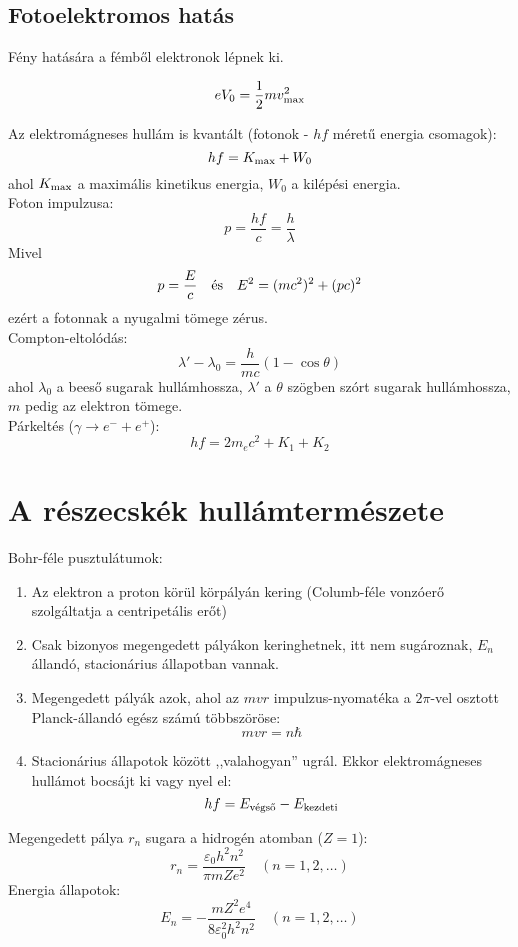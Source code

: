 \documentclass[12pt,a4paper,twocolumn]{article}
\begin{document}
  \subsection{Fotoelektromos hatás}

  Fény hatására a fémből elektronok lépnek ki.

  \[eV_0 = \frac{1}{2}mv_{\hbox{\scriptsize max}}^2\]
  
  Az elektromágneses hullám is kvantált (fotonok - $hf$ méretű energia csomagok):
  \[hf = K_{\hbox{\scriptsize max}} + W_0\]
  ahol $K_{\hbox{\scriptsize max}}$ a maximális kinetikus energia, $W_0$ a kilépési energia.\\

  Foton impulzusa:
  \[p = \frac{hf}{c} = \frac{h}{\lambda}\]
  Mivel
  \[p = \frac{E}{c} \quad \hbox{és} \quad E^2 = (mc^2)^2 + (pc)^2\]
  ezért a fotonnak a nyugalmi tömege zérus.\\

  Compton-eltolódás:
  \[\lambda' - \lambda_0 = \frac{h}{mc} (1-\cos \theta)\]
  ahol $\lambda_0$ a beeső sugarak hullámhossza, $\lambda'$ a $\theta$ szögben szórt sugarak hullámhossza,
  $m$ pedig az elektron tömege.\\

  Párkeltés ($\gamma \to e^- + e^+$):
  \[hf = 2m_ec^2 + K_1 + K_2\]

  \section{A részecskék hullámtermészete}

  Bohr-féle pusztulátumok:
  \begin{enumerate}
  \item Az elektron a proton körül körpályán kering (Columb-féle vonzóerő szolgáltatja a centripetális erőt)
  \item Csak bizonyos megengedett pályákon keringhetnek, itt nem sugároznak, $E_n$ állandó, stacionárius állapotban vannak.
  \item Megengedett pályák azok, ahol az $mvr$ impulzus-nyomatéka a $2\pi$-vel osztott Planck-állandó egész számú többszöröse:
   \[mvr = n\hbar\]
  \item Stacionárius állapotok között ,,valahogyan'' ugrál. Ekkor elektromágneses hullámot bocsájt ki vagy nyel el:
   \[hf = E_{\hbox{\scriptsize végső}} - E_{\hbox{\scriptsize kezdeti}}\]
  \end{enumerate}
 
  Megengedett pálya $r_n$ sugara a hidrogén atomban ($Z=1$):
  \[r_n = \frac{\varepsilon_0 h^2 n^2}{\pi m Z e^2} \quad (n=1,2,\ldots)\]
  Energia állapotok:
  \[E_n = -\frac{mZ^2e^4}{8\varepsilon_0^2 h^2 n^2} \quad (n=1,2,\ldots)\]
\end{document}

